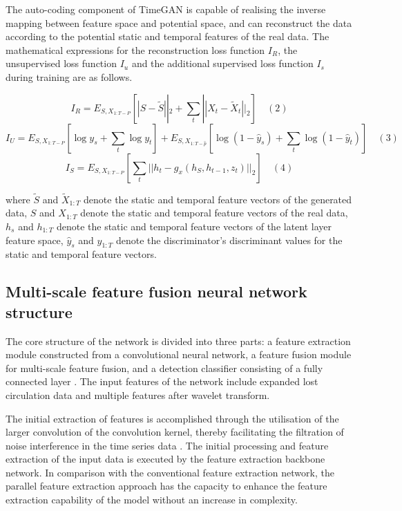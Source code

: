 \documentclass[journal,article,submit,pdftex,moreauthors]{Definitions/mdpi}
\begin{document}
The auto-coding component of TimeGAN is capable of realising the inverse mapping between feature space and potential space, and can reconstruct the data according to the potential static and temporal features of the real data. The mathematical expressions for the reconstruction loss function \({{I}_{R}}\), the unsupervised loss function \({{I}_{u}}\) and the additional supervised loss function \({{I}_{s}}\) during training are as follows.

$$ I _ { R } = E _ { S , X _ { 1: T - P } } \left[ | S - \tilde { S } | | _ { 2 } + \sum _ { t } | | X _ { t } - \tilde { X } _ { t } | | _ { 2 } \right]\quad (2)$$
$$ I _ { U } = E _ { S , X _ {1: T- P } } \left[ \log y _ { s } + \sum _ { t } \log y _ { t } \right] + E _ { S , X _ { 1: T - \widehat { p } } } \left[ \log ( 1 - \widehat { y } _ { s } ) + \sum _ { t } \log ( 1 - \widehat { y } _ { t } ) \right]\quad (3)$$
$$ I _ { S } = E _ { S , X _ { 1: T - P } } \left[ \sum _ { t } | | h _ { t } - g _ { x } ( h _ { S } , h _ { t - 1 } , z _ { t } ) | | _ { 2 } \right]\quad (4)$$

where \({{\widetilde{S}}}\) and \({{\widetilde{X}}_{1:T}}\) denote the static and temporal feature vectors of the generated data,  \({S}\) and \({X}_{1:T}\) denote the static and temporal feature vectors of the real data,  \({h}_{s}\) and  \({h}_{1:T}\) denote the static and temporal feature vectors of the latent layer feature space, \({{\widehat{y}}_{s}}\) and  \({{\widehat{y}}_{1:T}}\) denote the discriminator's discriminant values for the static and temporal feature vectors.
\subsection{Multi-scale feature fusion neural network structure }

The core structure of the network is divided into three parts: a feature extraction module constructed from a convolutional neural network, a feature fusion module for multi-scale feature fusion, and a detection classifier consisting of a fully connected layer \cite{zhaohongyu2023}. The input features of the network include expanded lost circulation data and multiple features after wavelet transform.

The initial extraction of features is accomplished through the utilisation of the larger convolution of the convolution kernel, thereby facilitating the filtration of noise interference in the time series data \cite{meizhou2024}. The initial processing and feature extraction of the input data is executed by the feature extraction backbone network. In comparison with the conventional feature extraction network, the parallel feature extraction approach has the capacity to enhance the feature extraction capability of the model without an increase in complexity\cite{lishutao2018}.
\end{document}
